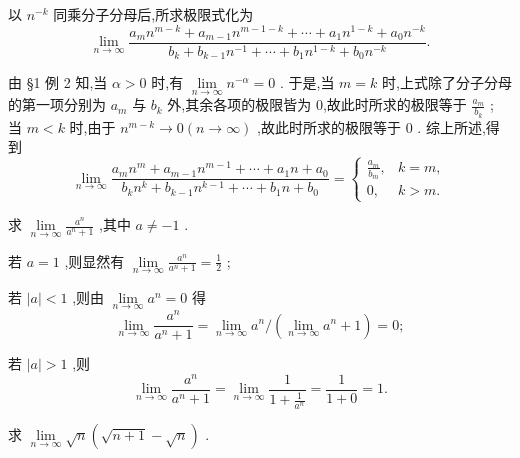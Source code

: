 \begin{solution}
以 \({n}^{-k}\) 同乘分子分母后,所求极限式化为
\[
\mathop{\lim }\limits_{{n \rightarrow  \infty }}\frac{{a}_{m}{n}^{m - k} + {a}_{m - 1}{n}^{m - 1 - k} + \cdots  + {a}_{1}{n}^{1 - k} + {a}_{0}{n}^{-k}}{{b}_{k} + {b}_{k - 1}{n}^{-1} + \cdots  + {b}_{1}{n}^{1 - k} + {b}_{0}{n}^{-k}}.
\]

由 §1 例 2 知,当 \(\alpha  > 0\) 时,有 \(\mathop{\lim }\limits_{{n \rightarrow  \infty }}{n}^{-\alpha } = 0\) . 于是,当 \(m = k\) 时,上式除了分子分母的第一项分别为 \({a}_{m}\) 与 \({b}_{k}\) 外,其余各项的极限皆为 0,故此时所求的极限等于 \(\frac{{a}_{m}}{{b}_{k}}\) ; 当 \(m < k\) 时,由于 \({n}^{m - k} \rightarrow  0\left( {n \rightarrow  \infty }\right)\) ,故此时所求的极限等于 0 . 综上所述,得到
\[
\mathop{\lim }\limits_{{n \rightarrow  \infty }}\frac{{a}_{m}{n}^{m} + {a}_{m - 1}{n}^{m - 1} + \cdots  + {a}_{1}n + {a}_{0}}{{b}_{k}{n}^{k} + {b}_{k - 1}{n}^{k - 1} + \cdots  + {b}_{1}n + {b}_{0}} = \left\{  \begin{array}{ll} \frac{{a}_{m}}{{b}_{m}}, & k = m, \\  0, & k > m. \end{array}\right.
\]
\end{solution}


\begin{example}
求 \(\mathop{\lim }\limits_{{n \rightarrow  \infty }}\frac{{a}^{n}}{{a}^{n} + 1}\) ,其中 \(a \neq   - 1\) .
\end{example}


\begin{solution}
若 \(a = 1\) ,则显然有 \(\mathop{\lim }\limits_{{n \rightarrow  \infty }}\frac{{a}^{n}}{{a}^{n} + 1} = \frac{1}{2}\) ;

若 \(\left| a\right|  < 1\) ,则由 \(\mathop{\lim }\limits_{{n \rightarrow  \infty }}{a}^{n} = 0\) 得
\[
\mathop{\lim }\limits_{{n \rightarrow  \infty }}\frac{{a}^{n}}{{a}^{n} + 1} = \mathop{\lim }\limits_{{n \rightarrow  \infty }}{a}^{n}/\left( {\mathop{\lim }\limits_{{n \rightarrow  \infty }}{a}^{n} + 1}\right)  = 0;
\]

若 \(\left| a\right|  > 1\) ,则
\[
\mathop{\lim }\limits_{{n \rightarrow  \infty }}\frac{{a}^{n}}{{a}^{n} + 1} = \mathop{\lim }\limits_{{n \rightarrow  \infty }}\frac{1}{1 + \frac{1}{{a}^{n}}} = \frac{1}{1 + 0} = 1.
\]
\end{solution}


\begin{example}
求 \(\mathop{\lim }\limits_{{n \rightarrow  \infty }}\sqrt{n}\left( {\sqrt{n + 1} - \sqrt{n}}\right)\) .
\end{example}


